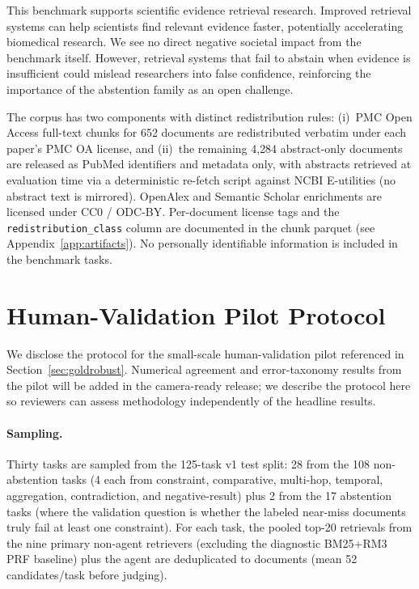 \documentclass{article}
\begin{document}
This benchmark supports scientific evidence retrieval research. Improved retrieval systems can help scientists find relevant evidence faster, potentially accelerating biomedical research. We see no direct negative societal impact from the benchmark itself. However, retrieval systems that fail to abstain when evidence is insufficient could mislead researchers into false confidence, reinforcing the importance of the abstention family as an open challenge.

The corpus has two components with distinct redistribution rules: (i)~PMC Open Access full-text chunks for 652 documents are redistributed verbatim under each paper's PMC OA license, and (ii)~the remaining 4{,}284 abstract-only documents are released as PubMed identifiers and metadata only, with abstracts retrieved at evaluation time via a deterministic re-fetch script against NCBI E-utilities (no abstract text is mirrored). OpenAlex and Semantic Scholar enrichments are licensed under CC0 / ODC-BY. Per-document license tags and the \texttt{redistribution\_class} column are documented in the chunk parquet (see Appendix~\ref{app:artifacts}). No personally identifiable information is included in the benchmark tasks.

\section{Human-Validation Pilot Protocol}
\label{app:humanpilot}

We disclose the protocol for the small-scale human-validation pilot referenced in Section~\ref{sec:goldrobust}. Numerical agreement and error-taxonomy results from the pilot will be added in the camera-ready release; we describe the protocol here so reviewers can assess methodology independently of the headline results.

\paragraph{Sampling.} Thirty tasks are sampled from the 125-task v1 test split: 28 from the 108 non-abstention tasks (4 each from constraint, comparative, multi-hop, temporal, aggregation, contradiction, and negative-result) plus 2 from the 17 abstention tasks (where the validation question is whether the labeled near-miss documents truly fail at least one constraint). For each task, the pooled top-20 retrievals from the nine primary non-agent retrievers (excluding the diagnostic BM25+RM3 PRF baseline) plus the agent are deduplicated to documents (mean 52 candidates/task before judging).
\end{document}
